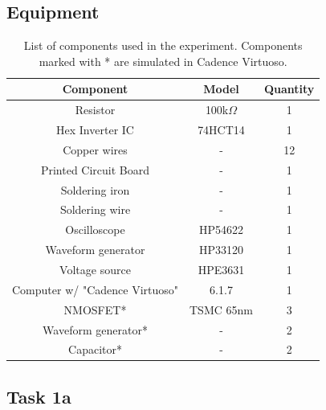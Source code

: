 \documentclass[onecolumn]{article}
\begin{document}
\subsection{Equipment}
\begin{table}[h!]
    \centering
    \begin{tabular}{|c|c|c|}
        \hline
        \textbf{Component} & \textbf{Model} & \textbf{Quantity} \\
        \hline
        Resistor & 100k$\Omega$ & 1 \\
        Hex Inverter IC & 74HCT14 & 1 \\
        Copper wires & - & 12 \\
        Printed Circuit Board & - & 1 \\
        Soldering iron & - & 1 \\
        Soldering wire & - & 1 \\
        Oscilloscope & HP54622 & 1 \\
        Waveform generator  & HP33120 & 1 \\
        Voltage source & HPE3631 & 1 \\
        Computer w/ "Cadence Virtuoso" & 6.1.7 & 1 \\
        NMOSFET* & TSMC 65nm & 3 \\
        Waveform generator* & - & 2 \\ 
        Capacitor* & - & 2 \\
        \hline
    \end{tabular}
    \caption{List of components used in the experiment. Components marked with * are simulated in Cadence Virtuoso.}
    \label{tab:bom}
\end{table}

\subsection{Task 1a}
\end{document}
